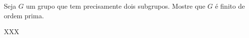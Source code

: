 \begin{homeworkProblem}
  Seja $G$ um grupo que tem precisamente dois subgrupos. Mostre que $G$ é finito de ordem prima.
  \begin{solution}
    XXX
  \end{solution}
\end{homeworkProblem}
